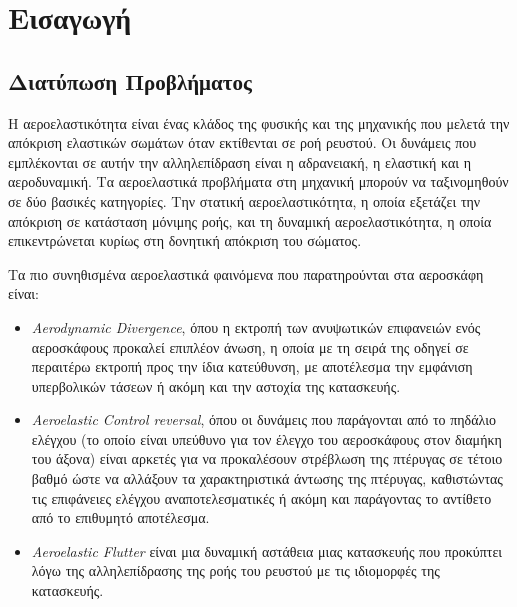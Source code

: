 \setcounter{chapter}{0}
\chapter{Εισαγωγή}\label{introduction}


\section{Διατύπωση Προβλήματος}\label{problem-statement}

Η αεροελαστικότητα είναι ένας κλάδος της φυσικής και της μηχανικής που μελετά την απόκριση ελαστικών σωμάτων όταν εκτίθενται σε ροή ρευστού. Οι δυνάμεις που εμπλέκονται σε αυτήν την αλληλεπίδραση είναι η αδρανειακή, η ελαστική και η αεροδυναμική. Τα αεροελαστικά προβλήματα στη μηχανική μπορούν να ταξινομηθούν σε δύο βασικές κατηγορίες. Την στατική αεροελαστικότητα, η οποία εξετάζει την απόκριση σε κατάσταση μόνιμης ροής, και τη δυναμική αεροελαστικότητα, η οποία επικεντρώνεται κυρίως στη δονητική απόκριση του σώματος.

Τα πιο συνηθισμένα αεροελαστικά φαινόμενα που παρατηρούνται στα αεροσκάφη είναι:

\begin{itemize}
\item
  \emph{\textlatin{Aerodynamic Divergence}}, όπου η εκτροπή των ανυψωτικών επιφανειών ενός αεροσκάφους προκαλεί επιπλέον άνωση, η οποία με τη σειρά της οδηγεί σε περαιτέρω εκτροπή προς την ίδια κατεύθυνση, με αποτέλεσμα την εμφάνιση υπερβολικών τάσεων ή ακόμη και την αστοχία της κατασκευής.
\item
  \emph{\textlatin{Aeroelastic Control reversal}}, όπου οι δυνάμεις που παράγονται από το πηδάλιο ελέγχου (το οποίο είναι υπεύθυνο για τον έλεγχο του αεροσκάφους στον διαμήκη του άξονα) είναι αρκετές για να προκαλέσουν στρέβλωση της πτέρυγας σε τέτοιο βαθμό ώστε να αλλάξουν τα χαρακτηριστικά άντωσης της πτέρυγας, καθιστώντας τις επιφάνειες ελέγχου αναποτελεσματικές ή ακόμη και παράγοντας το αντίθετο από το επιθυμητό αποτέλεσμα.
\item
  \emph{\textlatin{Aeroelastic Flutter}} είναι μια δυναμική αστάθεια μιας κατασκευής που προκύπτει λόγω της αλληλεπίδρασης της ροής του ρευστού με τις ιδιομορφές της κατασκευής.
\end{itemize}


